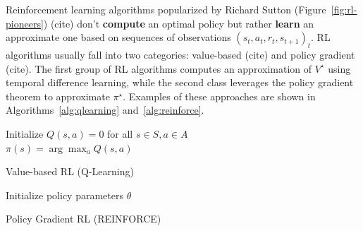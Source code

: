 Reinforcement learning algorithms popularized by Richard Sutton (Figure~\ref{fig:rl-pioneers}) (cite) don't \textbf{compute} an optimal policy but rather \textbf{learn} an approximate one based on sequences of observations ${(s_t, a_t, r_t, s_{t+1})}_t$.
RL algorithms usually fall into two categories: value-based (cite) and policy gradient (cite). The first group of RL algorithms computes an approximation of $V^{\star}$ using temporal difference learning, while the second class leverages the policy gradient theorem to approximate $\pi^{\star}$. Examples of these approaches are shown in Algorithms~\ref{alg:qlearning} and~\ref{alg:reinforce}.

\begin{algorithm}
    Initialize $Q(s,a) = 0$ for all $s \in S, a \in A$ \\
    $\pi(s) = \arg\max_a Q(s,a)$ 
    \caption{Value-based RL (Q-Learning)}\label{alg:qlearning}
\end{algorithm}


\begin{algorithm}
    Initialize policy parameters $\theta$ \\
    \caption{Policy Gradient RL (REINFORCE)}\label{alg:reinforce}
\end{algorithm}


